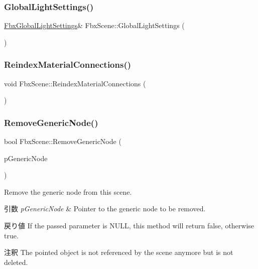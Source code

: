 \subsubsection{\texorpdfstring{Global\+Light\+Settings()}{GlobalLightSettings()}}
{\footnotesize\ttfamily \hyperlink{class_fbx_global_light_settings}{Fbx\+Global\+Light\+Settings}\& Fbx\+Scene\+::\+Global\+Light\+Settings (\begin{DoxyParamCaption}{ }\end{DoxyParamCaption})}

\mbox{\label{class_fbx_scene_ab36c6e602ec8eb39c9b0934f24a71886}} 
\subsubsection{\texorpdfstring{Reindex\+Material\+Connections()}{ReindexMaterialConnections()}}
{\footnotesize\ttfamily void Fbx\+Scene\+::\+Reindex\+Material\+Connections (\begin{DoxyParamCaption}{ }\end{DoxyParamCaption})}

\mbox{\label{class_fbx_scene_ada01a14ed31636b615d6e95c1f33e2ca}} 
\subsubsection{\texorpdfstring{Remove\+Generic\+Node()}{RemoveGenericNode()}}
{\footnotesize\ttfamily bool Fbx\+Scene\+::\+Remove\+Generic\+Node (\begin{DoxyParamCaption}\item[{\hyperlink{class_fbx_generic_node}{Fbx\+Generic\+Node} $\ast$}]{p\+Generic\+Node }\end{DoxyParamCaption})}

Remove the generic node from this scene. 
\begin{DoxyParams}{引数}
{\em p\+Generic\+Node} & Pointer to the generic node to be removed. \\
\hline
\end{DoxyParams}
\begin{DoxyReturn}{戻り値}
If the passed parameter is {\ttfamily N\+U\+LL}, this method will return {\ttfamily false}, otherwise {\ttfamily true}. 
\end{DoxyReturn}
\begin{DoxyRemark}{注釈}
The pointed object is not referenced by the scene anymore but is not deleted. 
\end{DoxyRemark}
\mbox{\label{class_fbx_scene_a9bbff92d4739c1a39489c8b9178e51b4}} 
